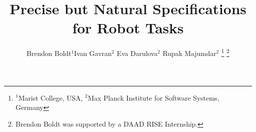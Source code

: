 \documentclass[letterpaper, 10 pt, conference]{ieeeconf}  %
\title{\LARGE \bf Precise but Natural Specifications for Robot Tasks
}
\author{Brendon Boldt$^1$\quad Ivan Gavran$^2$ \quad Eva Darulova$^2$ \quad Rupak Majumdar$^2$%
\thanks{
$^1$Marist College, USA,
$^2$Max Planck Institute for Software Systems, Germany
}%
\thanks{Brendon Boldt was supported by a DAAD RISE Internship.}
}
\begin{document}
\maketitle
\thispagestyle{empty}
\pagestyle{empty}


\begin{abstract}

\end{abstract}












\balance















\end{document}
